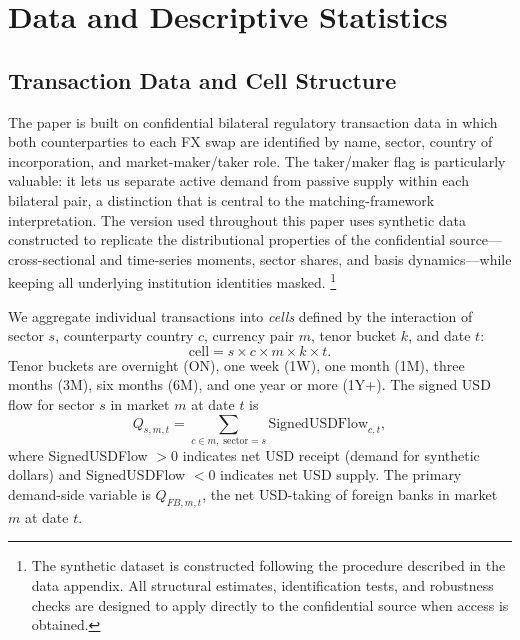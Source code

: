 
\section{Data and Descriptive Statistics}
\label{sec:data}

\subsection{Transaction Data and Cell Structure}
\label{subsec:data-structure}

The paper is built on confidential bilateral regulatory transaction data in which
both counterparties to each FX swap are identified by name, sector, country of
incorporation, and market-maker/taker role. The taker/maker flag is particularly
valuable: it lets us separate active demand from passive supply within each
bilateral pair, a distinction that is central to the matching-framework
interpretation. The version used throughout this paper uses synthetic data
constructed to replicate the distributional properties of the confidential
source---cross-sectional and time-series moments, sector shares, and basis
dynamics---while keeping all underlying institution identities masked.%
\footnote{The synthetic dataset is constructed following the procedure described
in the data appendix. All structural estimates, identification tests, and
robustness checks are designed to apply directly to the confidential source when
access is obtained.}

We aggregate individual transactions into \emph{cells} defined by the interaction
of sector $s$, counterparty country $c$, currency pair $m$, tenor bucket $k$,
and date $t$:
\[
  \text{cell} = s \times c \times m \times k \times t.
\]
Tenor buckets are overnight (ON), one week (1W), one month (1M), three months
(3M), six months (6M), and one year or more (1Y+). The signed USD flow for sector
$s$ in market $m$ at date $t$ is
\[
  Q_{s,m,t} = \sum_{c \in m,\; \text{sector}=s} \text{SignedUSDFlow}_{c,t},
\]
where SignedUSDFlow $> 0$ indicates net USD receipt (demand for synthetic dollars)
and SignedUSDFlow $< 0$ indicates net USD supply. The primary demand-side variable
is $Q_{FB,m,t}$, the net USD-taking of foreign banks in market $m$ at date $t$.

